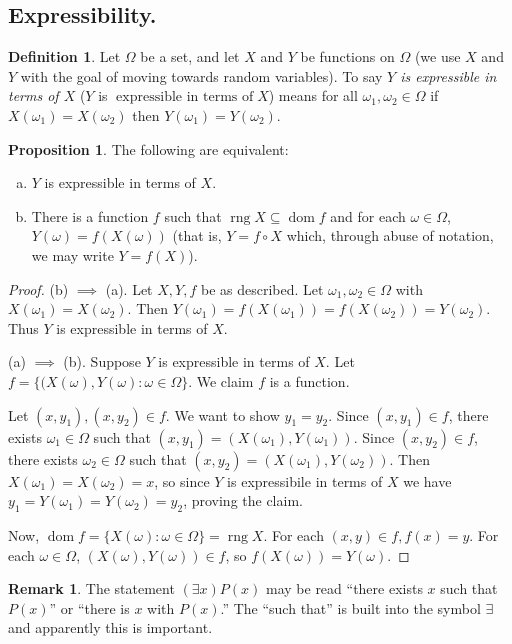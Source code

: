 \documentclass{article}
\DeclareMathOperator{\eit}{\text{expressible in terms of}}
\DeclareMathOperator{\dom}{dom}
\DeclareMathOperator{\rng}{rng}
\theoremstyle{definition}
\newtheorem{proposition}[theorem]{Proposition}
\newtheorem*{definition}{Definition}
\newtheorem*{remark}{Remark}
\begin{document}
\subsection*{Expressibility.}
\begin{definition}
Let $\Omega$ be a set, and let $X$ and $Y$ be functions on $\Omega$ (we use $X$ and $Y$ with the goal of moving towards random variables). To say \emph{$Y$ is expressible in terms of $X$} ($Y$ is $\eit X$) means for all $\omega_1, \omega_2 \in \Omega$ if $X(\omega_1) = X(\omega_2)$ then $Y(\omega_1) = Y(\omega_2)$.
\end{definition}
\begin{proposition}
The following are equivalent:
\begin{enumerate}[(a)]
    \item $Y$ is expressible in terms of $X$.
    \item There is a function $f$ such that $\rng X \subseteq \dom f$ and for each $\omega \in \Omega$, $Y(\omega) = f(X(\omega))$ (that is, $Y = f \circ X$ which, through abuse of notation, we may write $Y = f(X)$).
\end{enumerate}
\end{proposition}
\begin{proof}
    (b) $\implies$ (a). 
    Let $X, Y, f$ be as described. Let $\omega_1, \omega_2 \in \Omega$ with $X(\omega_1) = X(\omega_2)$. Then $Y(\omega_1) = f(X(\omega_1)) = f(X(\omega_2)) = Y(\omega_2)$. Thus $Y$ is expressible in terms of $X$.
    
    (a) $\implies$ (b).
    Suppose $Y$ is expressible in terms of $X$. Let $f = \{(X(\omega), Y(\omega) : \omega \in \Omega\}$. We claim $f$ is a function.
    
    Let $(x, y_1), (x, y_2) \in f$. We want to show $y_1 = y_2$. Since $(x, y_1) \in f$, there exists $\omega_1 \in \Omega$ such that $(x, y_1) = (X(\omega_1), Y(\omega_1))$. Since $(x, y_2) \in f$, there exists $\omega_2 \in \Omega$ such that $(x, y_2) = (X(\omega_1), Y(\omega_2))$. Then $X(\omega_1) = X(\omega_2) = x$, so since $Y$ is expressibile in terms of $X$ we have $y_1 = Y(\omega_1) = Y(\omega_2) = y_2$, proving the claim.
    
    Now, $\dom f = \{X(\omega) : \omega \in \Omega\} = \rng X$. For each $(x, y) \in f, f(x) = y$. For each $\omega \in \Omega$, $(X(\omega), Y(\omega)) \in f$, so $f(X(\omega)) = Y(\omega)$.
\end{proof}
\begin{remark}
    The statement $(\exists x)P(x)$ may be read ``there exists $x$ such that $P(x)$'' or ``there is $x$ with $P(x)$.'' The ``such that'' is built into the symbol $\exists$ and apparently this is important.
\end{remark}
\end{document}
